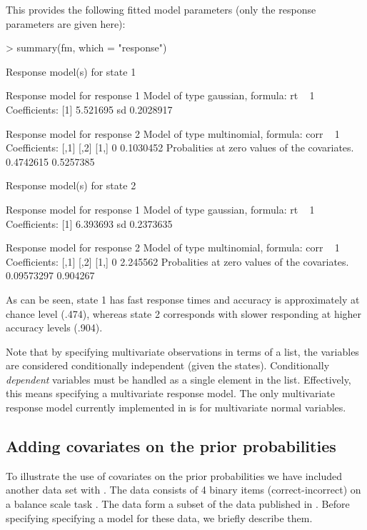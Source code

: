 \documentclass[article]{jss}
\begin{document}
This provides the following fitted model parameters (only the 
response parameters are given here): 
\begin{Schunk}
\begin{Sinput}
> summary(fm, which = "response")
\end{Sinput}
\begin{Soutput}
Response model(s) for state 1 

Response model for response 1 
Model of type gaussian, formula: rt ~ 1
Coefficients: 
[1] 5.521695
sd  0.2028917 

Response model for response 2 
Model of type multinomial, formula: corr ~ 1
Coefficients: 
     [,1]      [,2]
[1,]    0 0.1030452
Probalities at zero values of the covariates.
0.4742615 0.5257385 


Response model(s) for state 2 

Response model for response 1 
Model of type gaussian, formula: rt ~ 1
Coefficients: 
[1] 6.393693
sd  0.2373635 

Response model for response 2 
Model of type multinomial, formula: corr ~ 1
Coefficients: 
     [,1]     [,2]
[1,]    0 2.245562
Probalities at zero values of the covariates.
0.09573297 0.904267 
\end{Soutput}
\end{Schunk}

As can be seen, state 1 has fast response times and accuracy is
approximately at chance level (.474), whereas state 2 corresponds with
slower responding at higher accuracy levels (.904).

Note that by specifying multivariate observations in terms of a list,
the variables are considered conditionally independent (given the
states).  Conditionally \emph{dependent} variables must be handled as
a single element in the list.  Effectively, this means specifying a
multivariate response model.  The only multivariate response model
currently implemented in  is for multivariate normal
variables.

\subsection{Adding covariates on the prior probabilities\label{sec:prior}}

To illustrate the use of covariates on the prior probabilities we have
included another data set with .  The 
data consists of 4 binary items (correct-incorrect) on a balance scale
task \citep{Siegler1981}.  The data form a subset of the data
published in \citet{Jansen2002}. Before specifying specifying a model 
for these data, we briefly describe them. 
\end{document}
